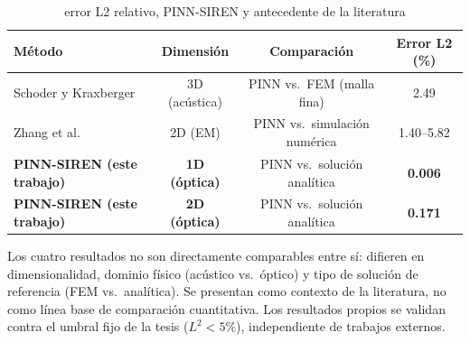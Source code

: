 \begin{table}[t]
\centering
\renewcommand{\arraystretch}{1.2}
\caption{error L2 relativo, PINN-SIREN y antecedente de la literatura}
\label{tab:comparativa}
\begin{tabular}{lccc}
\hline
Método & Dimensión & Comparación & Error L2 (\%) \\
\hline
Schoder y Kraxberger \cite{Schoder2024_PINN_acoustics} & 3D (acústica) & PINN vs.\ FEM (malla fina) & 2.49 \\
Zhang et al. \cite{Zhang2025_FEPIRBN} & 2D (EM) & PINN vs.\ simulación numérica & 1.40--5.82 \\
\textbf{PINN-SIREN (este trabajo)} & \textbf{1D (óptica)} & PINN vs.\ solución analítica & \textbf{0.006} \\
\textbf{PINN-SIREN (este trabajo)} & \textbf{2D (óptica)} & PINN vs.\ solución analítica & \textbf{0.171} \\
\hline
\end{tabular}

\vspace{4pt}
\begin{minipage}{\textwidth}
\footnotesize Los cuatro resultados no son directamente comparables entre sí: difieren en
dimensionalidad, dominio físico (acústico vs.\ óptico) y tipo de solución
de referencia (FEM vs.\ analítica). Se presentan como contexto de la
literatura, no como línea base de comparación cuantitativa. Los resultados
propios se validan contra el umbral fijo de la tesis ($L^2 < 5\%$),
independiente de trabajos externos.
\end{minipage}
\end{table}
